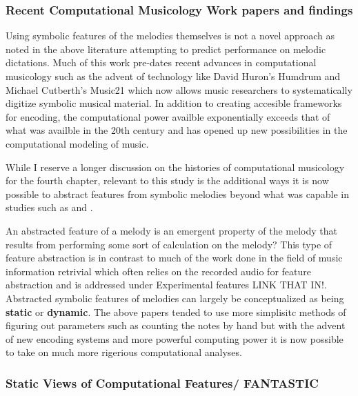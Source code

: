 \documentclass[]{book}
\begin{document}
\hypertarget{recent-computational-musicology-work-papers-and-findings}{%
\subsubsection{Recent Computational Musicology Work papers and findings}\label{recent-computational-musicology-work-papers-and-findings}}

Using symbolic features of the melodies themselves is not a novel approach as noted in the above literature attempting to predict performance on melodic dictations.
Much of this work pre-dates recent advances in computational musicology such as the advent of technology like David Huron's Humdrum \citep{huronHumdrumToolkitReference1994} and Michael Cutberth's Music21 \citep{cuthbertMusic21ToolkitComputerAided2010} which now allows music researchers to systematically digitize symbolic musical material.
In addition to creating accesible frameworks for encoding, the computational power availble exponentially exceeds that of what was availble in the 20th century and has opened up new possibilities in the computational modeling of music.

While I reserve a longer discussion on the histories of computational musicology for the fourth chapter, relevant to this study is the additional ways it is now possible to abstract features from symbolic melodies beyond what was capable in studies such as \citet{ortmannTonalDeterminantsMelodic1933} and \citet{taylorStrategiesMemoryShort1983}.

An abstracted feature of a melody is an emergent property of the melody that results from performing some sort of calculation on the melody?
This type of feature abstraction is in contrast to much of the work done in the field of music information retrivial which often relies on the recorded audio for feature abstraction and is addressed under Experimental features LINK THAT IN!.
Abstracted symbolic features of melodies can largely be conceptualized as being \textbf{static} or \textbf{dynamic}.
The above papers tended to use more simplisitc methods of figuring out parameters such as counting the notes by hand but with the advent of new encoding systems and more powerful computing power it is now possible to take on much more rigerious computational analyses.

\hypertarget{static-views-of-computational-features-fantastic}{%
\subsubsection{Static Views of Computational Features/ FANTASTIC}\label{static-views-of-computational-features-fantastic}}
\end{document}
